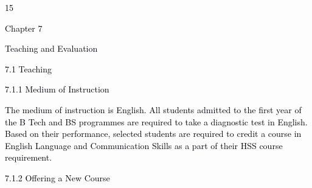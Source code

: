 \documentclass[12pt]{article}
\begin{document}
\vspace{\baselineskip}

\vspace{\baselineskip}

\vspace{\baselineskip}

\vspace{\baselineskip}

\vspace{\baselineskip}

\vspace{\baselineskip}
\begin{Center}
\textcolor[HTML]{00000A}{15}
\end{Center}\par


\vspace{\baselineskip}
{\fontsize{14pt}{16.8pt}\selectfont \textcolor[HTML]{00000A}{Chapter 7}\par}\par


\vspace{\baselineskip}
{\fontsize{20pt}{24.0pt}\selectfont \textcolor[HTML]{00000A}{Teaching and Evaluation}\par}\par


\vspace{\baselineskip}
\textcolor[HTML]{00000A}{7.1 Teaching}\par


\vspace{\baselineskip}
{\fontsize{10pt}{12.0pt}\selectfont \textcolor[HTML]{00000A}{7.1.1 Medium of Instruction}\par}\par


\vspace{\baselineskip}
\begin{justify}
{\fontsize{10pt}{12.0pt}\selectfont \textcolor[HTML]{00000A}{The medium of instruction is English. All students admitted to the first year of the B Tech and BS programmes are required to take a diagnostic test in English. Based on their performance, selected students are required to credit a course in English Language and Communication Skills as a part of their HSS course requirement.}\par}
\end{justify}\par


\vspace{\baselineskip}
{\fontsize{10pt}{12.0pt}\selectfont \textcolor[HTML]{00000A}{7.1.2 Offering a New Course}\par}\par
\end{document}
